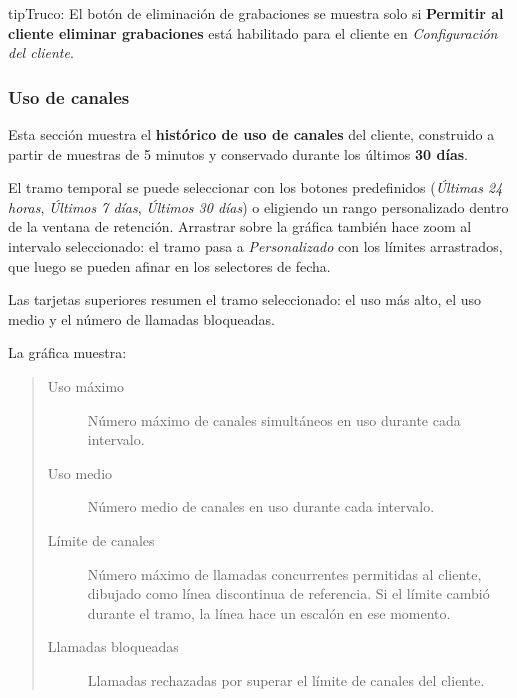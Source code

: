 \documentclass[letterpaper,10pt,spanish]{sphinxmanual}
\begin{document}
\begin{notice}{tip}{Truco:}
El botón de eliminación de grabaciones se muestra solo si \textbf{Permitir al cliente eliminar grabaciones} está habilitado para el cliente en \emph{Configuración del cliente}.
\end{notice}


\subsubsection{Uso de canales}
\label{administration_portal/client/residential/calls/channel_usage:channel-usage}\label{administration_portal/client/residential/calls/channel_usage::doc}
Esta sección muestra el \textbf{histórico de uso de canales} del cliente, construido a partir de muestras de 5 minutos y conservado durante los últimos \textbf{30 días}.

El tramo temporal se puede seleccionar con los botones predefinidos (\emph{Últimas 24 horas}, \emph{Últimos 7 días}, \emph{Últimos 30 días}) o eligiendo un rango personalizado dentro de la ventana de retención. Arrastrar sobre la gráfica también hace zoom al intervalo seleccionado: el tramo pasa a \emph{Personalizado} con los límites arrastrados, que luego se pueden afinar en los selectores de fecha.

Las tarjetas superiores resumen el tramo seleccionado: el uso más alto, el uso medio y el número de llamadas bloqueadas.

La gráfica muestra:
\begin{quote}
\begin{description}
\item[{Uso máximo}] \leavevmode
Número máximo de canales simultáneos en uso durante cada intervalo.

\item[{Uso medio}] \leavevmode
Número medio de canales en uso durante cada intervalo.

\item[{Límite de canales}] \leavevmode
Número máximo de llamadas concurrentes permitidas al cliente, dibujado como línea discontinua de referencia. Si el límite cambió durante el tramo, la línea hace un escalón en ese momento.

\item[{Llamadas bloqueadas}] \leavevmode
Llamadas rechazadas por superar el límite de canales del cliente.

\end{description}
\end{quote}
\end{document}
